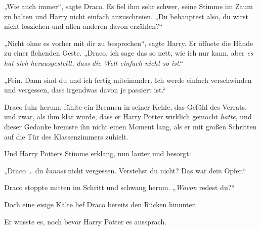 „Wie auch immer“, sagte Draco. Es fiel ihm sehr schwer, seine Stimme im Zaum zu halten und Harry nicht einfach anzuschreien.
„Du behauptest also, du wirst nicht losziehen und allen anderen davon erzählen?“

„Nicht ohne es vorher mit dir zu besprechen“, sagte Harry. Er öffnete die Hände zu einer flehenden Geste.
„Draco, ich sage das so nett, wie ich nur kann, aber \emph{es hat sich herausgestellt,} \emph{dass} \emph{die Welt einfach nicht so} \emph{ist}.“

„Fein. Dann sind du und ich fertig miteinander. Ich werde einfach verschwinden und vergessen, dass irgendwas davon je passiert ist.“

Draco fuhr herum, fühlte ein Brennen in seiner Kehle, das Gefühl des Verrats, und zwar, als ihm klar wurde, dass er Harry Potter wirklich gemocht \emph{hatte}, und dieser Gedanke bremste ihn nicht einen Moment lang, als er mit großen Schritten auf die Tür des Klassenzimmers zuhielt.

Und Harry Potters Stimme erklang, nun lauter und besorgt:

„Draco … du \emph{kannst} nicht vergessen. Verstehst du nicht? Das war dein Opfer.“

Draco stoppte mitten im Schritt und schwang herum.
„\emph{Wovon} redest du?“

Doch eine eisige Kälte lief Draco bereits den Rücken hinunter.

Er wusste es, noch bevor Harry Potter es aussprach.

